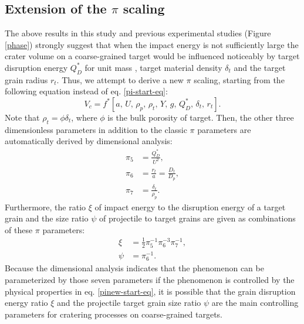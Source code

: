 \documentclass[3p,authoryear]{elsarticle}
\begin{document}
\subsection{Extension of the $\pi$ scaling} \label{sec:extension-pi}
The above results in this study and previous experimental studies (Figure \ref{phase}) strongly suggest that when the impact energy is not sufficiently large the crater volume on a coarse-grained target would be influenced noticeably by target disruption energy $Q_D^*$ for unit mass \citep[e.g.][]{fujiwara1980b, benz1999}, target material density $\delta_t$ and the target grain radius $r_t$.
Thus, we attempt to derive a new $\pi$ scaling, starting from the following equation instead of eq. \eqref{pi-start-eq}:
\begin{equation}
	V_c=f^*[a,\,U,\,\rho_p,\, \rho_t,\,Y,\, g,\, Q_D^*, \,\delta_t,\, r_t]. \label{pinew-start-eq}
\end{equation}
Note that $\rho_t=\phi \delta_t$, where $\phi$ is the bulk porosity of target.
Then, the other three dimensionless parameters in addition to the classic $\pi$ parameters are automatically derived by dimensional analysis:
\begin{align}
	\pi_5&=\frac{Q_D^*}{U^2},\\
	\pi_6&=\frac{r_t}{a}=\frac{D_t}{D_p},\\
	\pi_7&=\frac{\delta_t}{\rho_p}.
\end{align}
Furthermore, the ratio $\xi$ of impact energy to the disruption energy of a target grain and the size ratio $\psi$ of projectile to target grains are given as combinations of these $\pi$ parameters:
\begin{align}
	\xi&=\frac{1}{2}\pi_5^{-1}\pi_6^{-3}\pi_7^{-1},\\
	\psi&=\pi_6^{-1}.
\end{align}
Because the dimensional analysis indicates that the phenomenon can be parameterized by those seven parameters if the phenomenon is controlled by the physical properties in eq. \eqref{pinew-start-eq}, it is possible that the grain disruption energy ratio $\xi$ and the projectile target grain size ratio $\psi$ are the main controlling parameters for cratering processes on coarse-grained targets.
\end{document}
